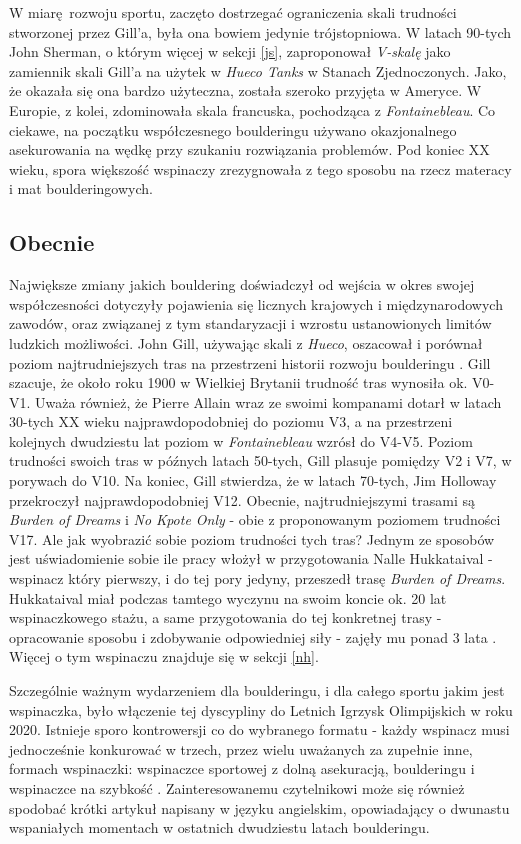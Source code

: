 \documentclass{article}
\begin{document}
W miarę rozwoju sportu, zaczęto dostrzegać ograniczenia skali trudności stworzonej przez Gill'a, była ona bowiem jedynie trójstopniowa. W latach 90-tych John Sherman, o którym więcej w sekcji \ref{js}, zaproponował \textit{V-skalę} jako zamiennik skali Gill'a na użytek w \textit{Hueco Tanks} w Stanach Zjednoczonych. Jako, że okazała się ona bardzo użyteczna, została szeroko przyjęta w Ameryce. W Europie, z kolei, zdominowała skala francuska, pochodząca z \textit{Fontainebleau}. Co ciekawe, na początku współczesnego boulderingu używano okazjonalnego asekurowania na wędkę przy szukaniu rozwiązania problemów. Pod koniec XX wieku, spora większość wspinaczy zrezygnowała z tego sposobu na rzecz materacy i mat boulderingowych.

\subsection{Obecnie}
Największe zmiany jakich bouldering doświadczył od wejścia w okres swojej współczesności dotyczyły pojawienia się licznych krajowych i międzynarodowych zawodów, oraz związanej z tym standaryzacji i wzrostu ustanowionych limitów ludzkich możliwości. John Gill, używając skali z \textit{Hueco}, oszacował i porównał poziom najtrudniejszych tras na przestrzeni historii rozwoju boulderingu \cite{gill-history}. Gill szacuje, że około roku 1900 w Wielkiej Brytanii trudność tras wynosiła ok. V0-V1. Uważa również, że Pierre Allain wraz ze swoimi kompanami dotarł w latach 30-tych XX wieku najprawdopodobniej do poziomu V3, a na przestrzeni kolejnych dwudziestu lat poziom w \textit{Fontainebleau} wzrósł do V4-V5. Poziom trudności swoich tras w późnych latach 50-tych, Gill plasuje pomiędzy V2 i V7, w porywach do V10. Na koniec, Gill stwierdza, że w latach 70-tych, Jim Holloway przekroczył najprawdopodobniej V12. Obecnie, najtrudniejszymi trasami są \textit{Burden of Dreams} i \textit{No Kpote Only} - obie z proponowanym poziomem trudności V17. Ale jak wyobrazić sobie poziom trudności tych tras? Jednym ze sposobów jest uświadomienie sobie ile pracy włożył w przygotowania Nalle Hukkataival - wspinacz który pierwszy, i do tej pory jedyny, przeszedł trasę \textit{Burden of Dreams}. Hukkataival miał podczas tamtego wyczynu na swoim koncie ok. 20 lat wspinaczkowego stażu, a same przygotowania do tej konkretnej trasy - opracowanie sposobu i zdobywanie odpowiedniej siły - zajęły mu ponad 3 lata \cite{hukkataival-yt}. Więcej o tym wspinaczu znajduje się w sekcji \ref{nh}. 

Szczególnie ważnym wydarzeniem dla boulderingu, i dla całego sportu jakim jest wspinaczka, było włączenie tej dyscypliny do Letnich Igrzysk Olimpijskich w roku 2020. Istnieje sporo kontrowersji co do wybranego formatu - każdy wspinacz musi jednocześnie konkurować w trzech, przez wielu uważanych za zupełnie inne, formach wspinaczki: wspinaczce sportowej z dolną asekuracją, boulderingu i wspinaczce na szybkość \cite{olympics}. Zainteresowanemu czytelnikowi może się również spodobać krótki artykuł \cite{great-moments} napisany w języku angielskim, opowiadający o dwunastu wspaniałych momentach w ostatnich dwudziestu latach boulderingu.
\end{document}
